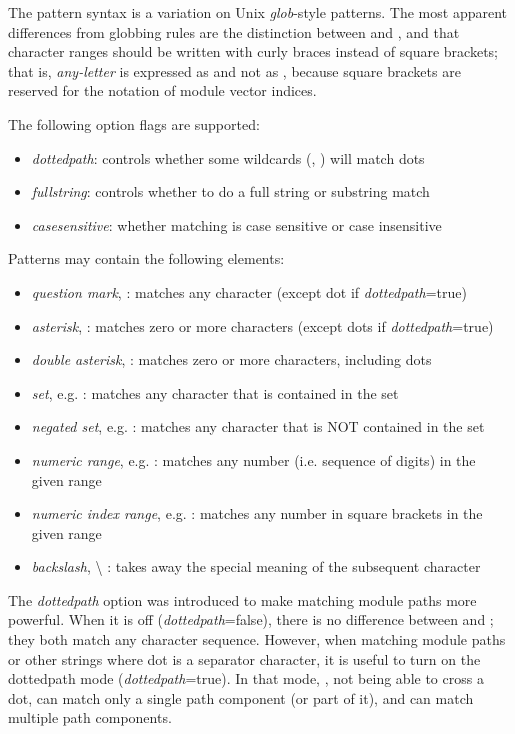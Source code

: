 The pattern syntax is a variation on Unix \textit{glob}-style patterns. The
most apparent differences from globbing rules are the distinction between
\ttt{*} and \ttt{**}, and that character ranges should be written with
curly braces instead of square brackets; that is, \textit{any-letter} is
expressed as  and not as \ttt{[a-zA-Z]}, because square
brackets are reserved for the notation of module vector indices.

The following option flags are supported:

\begin{itemize}
  \item \textit{dottedpath}: controls whether some wildcards (, \ttt{*}) will match dots
  \item \textit{fullstring}: controls whether to do a full string or substring match
  \item \textit{casesensitive}: whether matching is case sensitive or case insensitive
\end{itemize}

Patterns may contain the following elements:

\begin{itemize}
  \item \textit{question mark},  : matches any character (except dot if \textit{dottedpath}=true)
  \item \textit{asterisk}, \ttt{*} : matches zero or more characters (except dots if \textit{dottedpath}=true)
  \item \textit{double asterisk}, \ttt{**} : matches zero or more characters, including dots
  \item \textit{set}, e.g.  : matches any character that is contained in the set
  \item \textit{negated set}, e.g. : matches any character that is NOT contained in the set
  \item \textit{numeric range}, e.g.  : matches any number (i.e. sequence of digits) in the given range
  \item \textit{numeric index range}, e.g. \ttt{[38..150]} : matches any number in square brackets in the given range
  \item \textit{backslash}, {\textbackslash} : takes away the special meaning of the subsequent character
\end{itemize}

\begin{note}
The \textit{dottedpath} option was introduced to make matching {\opp}
module paths more powerful. When it is off (\textit{dottedpath}=false),
there is no difference between \ttt{*} and \ttt{**}; they both match any
character sequence. However, when matching {\opp} module paths or other
strings where dot is a separator character, it is useful to turn on the
dottedpath mode (\textit{dottedpath}=true). In that mode, \ttt{*}, not
being able to cross a dot, can match only a single path component (or part
of it), and \ttt{**} can match multiple path components.
\end{note}

